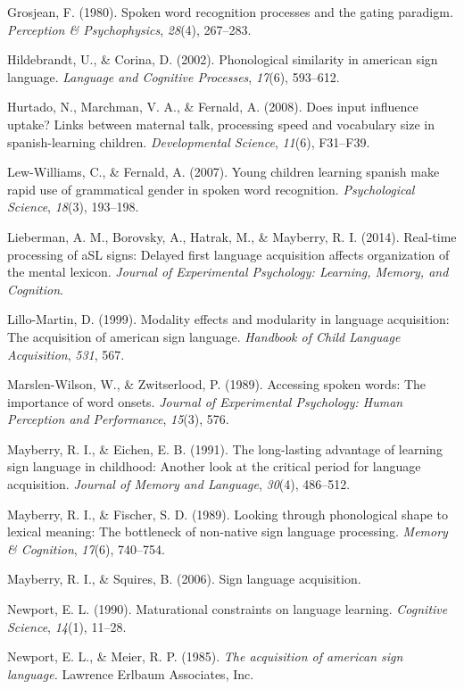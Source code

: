\documentclass[12pt,]{article}
\begin{document}
Grosjean, F. (1980). Spoken word recognition processes and the gating
paradigm. \emph{Perception \& Psychophysics}, \emph{28}(4), 267--283.

Hildebrandt, U., \& Corina, D. (2002). Phonological similarity in
american sign language. \emph{Language and Cognitive Processes},
\emph{17}(6), 593--612.

Hurtado, N., Marchman, V. A., \& Fernald, A. (2008). Does input
influence uptake? Links between maternal talk, processing speed and
vocabulary size in spanish-learning children. \emph{Developmental
Science}, \emph{11}(6), F31--F39.

Lew-Williams, C., \& Fernald, A. (2007). Young children learning spanish
make rapid use of grammatical gender in spoken word recognition.
\emph{Psychological Science}, \emph{18}(3), 193--198.

Lieberman, A. M., Borovsky, A., Hatrak, M., \& Mayberry, R. I. (2014).
Real-time processing of aSL signs: Delayed first language acquisition
affects organization of the mental lexicon. \emph{Journal of
Experimental Psychology: Learning, Memory, and Cognition}.

Lillo-Martin, D. (1999). Modality effects and modularity in language
acquisition: The acquisition of american sign language. \emph{Handbook
of Child Language Acquisition}, \emph{531}, 567.

Marslen-Wilson, W., \& Zwitserlood, P. (1989). Accessing spoken words:
The importance of word onsets. \emph{Journal of Experimental Psychology:
Human Perception and Performance}, \emph{15}(3), 576.

Mayberry, R. I., \& Eichen, E. B. (1991). The long-lasting advantage of
learning sign language in childhood: Another look at the critical period
for language acquisition. \emph{Journal of Memory and Language},
\emph{30}(4), 486--512.

Mayberry, R. I., \& Fischer, S. D. (1989). Looking through phonological
shape to lexical meaning: The bottleneck of non-native sign language
processing. \emph{Memory \& Cognition}, \emph{17}(6), 740--754.

Mayberry, R. I., \& Squires, B. (2006). Sign language acquisition.

Newport, E. L. (1990). Maturational constraints on language learning.
\emph{Cognitive Science}, \emph{14}(1), 11--28.

Newport, E. L., \& Meier, R. P. (1985). \emph{The acquisition of
american sign language.} Lawrence Erlbaum Associates, Inc.
\end{document}
